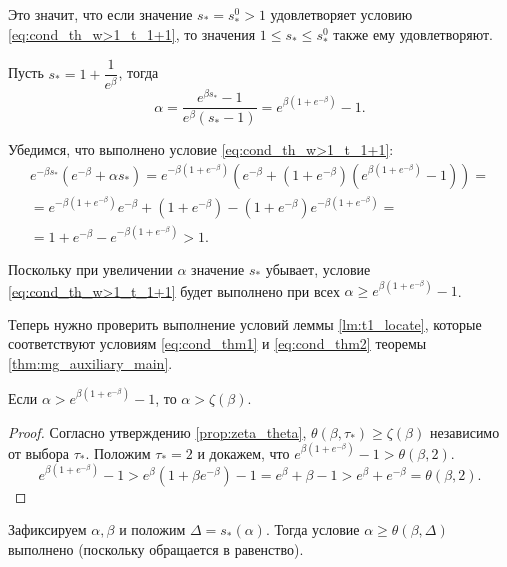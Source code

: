 Это значит, что если значение $s_* =  s_*^0 > 1$ удовлетворяет условию \eqref{eq:cond_th_w>1_t_1+1}, то значения $1 \leqslant  s_* \leqslant s_*^0$ также ему удовлетворяют.

Пусть $s_* = 1 + \dfrac{1}{e^{\beta}}$, тогда
\begin{equation}
	\alpha = \frac{e^{\beta s_*} - 1}{e^{\beta}(s_* - 1)} = e^{\beta(1 + e^{-\beta})} - 1.
\end{equation}

Убедимся, что выполнено условие \eqref{eq:cond_th_w>1_t_1+1}:
\begin{multline}
	e^{-\beta s_*}(e^{-\beta} + \alpha s_*) =
	e^{-\beta (1 + e^{-\beta})}\left(e^{-\beta} + (1 + e^{-\beta})(e^{\beta(1 + e^{-\beta})} - 1)\right) =\\
	= e^{-\beta (1 + e^{-\beta})} e^{-\beta} + (1 + e^{-\beta}) - (1 + e^{-\beta})e^{-\beta (1 + e^{-\beta})} = \\ = 1 + e^{-\beta} - e^{-\beta (1 + e^{-\beta})} > 1.
\end{multline}

Поскольку при увеличении $\alpha$ значение $s_*$ убывает, условие \eqref{eq:cond_th_w>1_t_1+1} будет выполнено при всех $\alpha \geqslant e^{\beta(1 + e^{-\beta})} - 1$.

Теперь нужно проверить выполнение условий леммы \ref{lm:t1_locate}, которые соответствуют условиям \eqref{eq:cond_thm1} и \eqref{eq:cond_thm2} теоремы \ref{thm:mg_auxiliary_main}.

\begin{proposition}
	\label{prop:alpha_greater_zeta}
	Если $\alpha > e^{\beta(1 + e^{-\beta})} - 1$, то $\alpha > \zeta(\beta)$.
\end{proposition}
\begin{proof}
	Согласно утверждению \ref{prop:zeta_theta}, $\theta(\beta, \tau_*) \geqslant \zeta(\beta)$ независимо от выбора $\tau_*$. Положим $\tau_* = 2$ и докажем, что $e^{\beta(1 + e^{-\beta})} - 1 > \theta(\beta, 2)$.
	\[
	e^{\beta(1 + e^{-\beta})} - 1 >
	e^{\beta} (1 + \beta e^{-\beta}) - 1 =
	e^{\beta} + \beta - 1 > e^{\beta} + e^{-\beta} = \theta(\beta, 2).
	\]
\end{proof}

Зафиксируем $\alpha, \beta$ и положим $\Delta =  s_*(\alpha)$. Тогда условие $\alpha \geqslant \theta(\beta, \Delta)$ выполнено (поскольку обращается в равенство).

